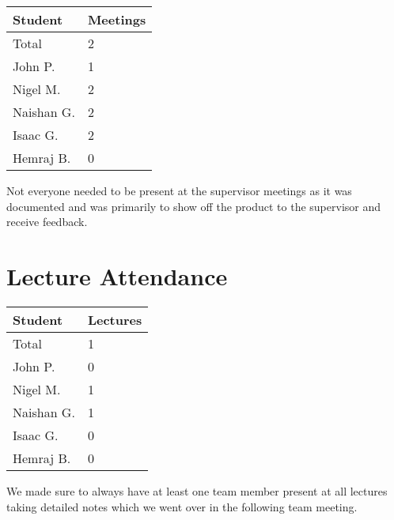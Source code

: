 \documentclass{article}
\begin{document}
\begin{table}[H]
\centering
\begin{tabular}{ll}
\toprule
\textbf{Student} & \textbf{Meetings}\\
\midrule
Total & 2\\
John P. & 1\\
Nigel M. & 2\\
Naishan G. & 2\\
Isaac G. & 2\\
Hemraj B. & 0\\
\bottomrule
\end{tabular}
\end{table}

Not everyone needed to be present at the supervisor meetings as it was documented and was primarily to show off the product to the supervisor and receive feedback.


\newpage
\section{Lecture Attendance}


\begin{table}[H]
\centering
\begin{tabular}{ll}
\toprule
\textbf{Student} & \textbf{Lectures}\\
\midrule
Total & 1\\
John P. & 0\\
Nigel M. & 1\\
Naishan G. & 1\\
Isaac G. & 0\\
Hemraj B. & 0\\
\bottomrule
\end{tabular}
\end{table}

We made sure to always have at least one team member present at all lectures taking detailed notes which we went over in the following team meeting.

\end{document}
